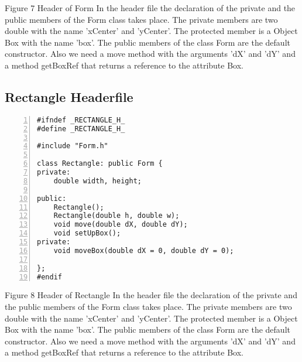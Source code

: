 \documentclass{llncs}
\begin{document}
\scriptsize{Figure 7 Header of Form}\newline
\newline
\newline
In the header file the declaration of the private and the public members of the Form class takes place.\newline
The private members are two double with the name 'xCenter' and 'yCenter'.
The protected member is a Object Box with the name 'box'.
The public members of the class Form are the default constructor.\newline 
Also we need a move method with the arguments 'dX' and 'dY' and a method getBoxRef that returns a reference to the attribute Box.\newline
\newline
\subsection{Rectangle Headerfile}
\begin{lstlisting}[basicstyle=\footnotesize\ttfamily, numbers=left, stepnumber=1, numberstyle = \normalsize]
#ifndef _RECTANGLE_H_
#define _RECTANGLE_H_

#include "Form.h"

class Rectangle: public Form {
private:
	double width, height; 

public:
	Rectangle();
	Rectangle(double h, double w);
	void move(double dX, double dY);
	void setUpBox();
private:
	void moveBox(double dX = 0, double dY = 0);
	
};
#endif
\end{lstlisting}
\scriptsize{Figure 8 Header of Rectangle}\newline
\newline
\newline
In the header file the declaration of the private and the public members of the Form class takes place.\newline
The private members are two double with the name 'xCenter' and 'yCenter'.
The protected member is a Object Box with the name 'box'.
The public members of the class Form are the default constructor.\newline 
Also we need a move method with the arguments 'dX' and 'dY' and a method getBoxRef that returns a reference to the attribute Box.\newline
\newline
\end{document}
